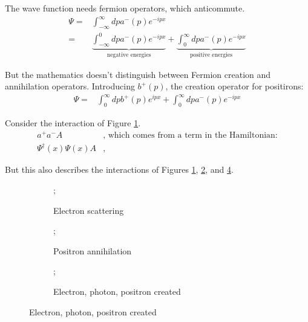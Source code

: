 \documentclass[]{article}
\begin{document}
The wave function needs fermion operators, which anticommute.
\begin{align*}
	\Psi =& \int_{-\infty}^{\infty} dp a^-(p) e^{-ipx}\\
	=& \underbrace{\int_{-\infty}^0 dp a^-(p) e^{-ipx}}_\text{negative energies}+ \underbrace{\int_0^{\infty} dp a^-(p) e^{-ipx}}_\text{positive energies}
\end{align*}

But the mathematics doesn't distinguish between Fermion creation and annihilation operators. Introducing $b^+(p)$, the creation operator for positirons:
\begin{align*}
	\Psi =&  \int_0^{\infty} dp  b^+(p) e^{ipx}+ \int_0^{\infty} dp a^-(p) e^{-ipx}
\end{align*}

Consider the interaction of Figure \ref{fig:electron_scattering_dirac}.
\begin{align*}
	a^+a^-A& \text{, which comes from a term in the Hamiltonian:}\\
	\Psi^\dagger(x)\Psi(x)A&\text{, }
\end{align*}

But this also describes the interactions of  Figures \ref{fig:electron_scattering_dirac}, \ref{fig:positron annihilating_dirac}, and \ref{fig:all3-created}.
\begin{figure}[H]
	\caption{Possible outcomes of $\Psi^\dagger(x)\Psi(x)A$: Feynman diagrams.}
	\begin{subfigure}{0.3\textwidth}
		\caption{Electron scattering}\label{fig:electron_scattering_dirac}
		;
	\end{subfigure}
	\begin{subfigure}{0.3\textwidth}
		\caption{Positron annihilation}\label{fig:positron annihilating_dirac}
		;
	\end{subfigure}
	\begin{subfigure}{0.3\textwidth}
		\caption{Electron, photon, positron created}\label{fig:all3-created}
		;
	\end{subfigure}
\end{figure}
\end{document}
